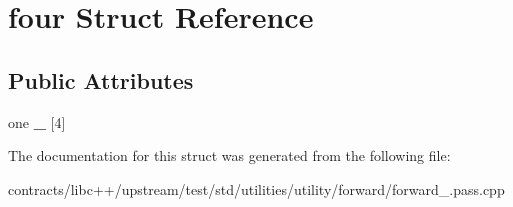 \hypertarget{structfour}{}\section{four Struct Reference}
\label{structfour}
\subsection*{Public Attributes}
\begin{DoxyCompactItemize}
\item 
\mbox{\label{structfour_a503c0e1f2cdaaae06eed1d79af66d320}} 
one {\bfseries \+\_\+} \mbox{[}4\mbox{]}
\end{DoxyCompactItemize}


The documentation for this struct was generated from the following file\+:\begin{DoxyCompactItemize}
\item 
contracts/libc++/upstream/test/std/utilities/utility/forward/forward\+\_.\+pass.\+cpp\end{DoxyCompactItemize}
